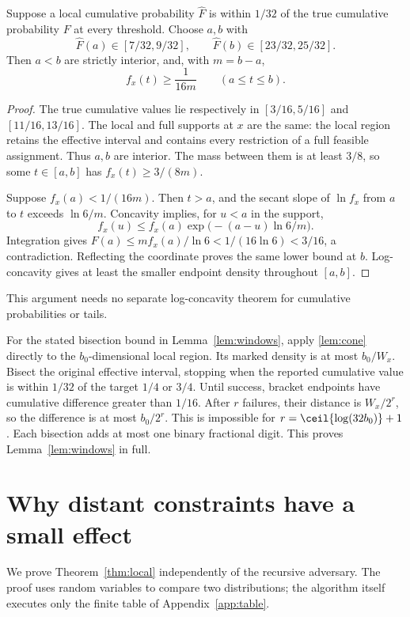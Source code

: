 \begin{lemma}\label{lem:quartile}
Suppose a local cumulative probability $\widehat F$ is within $1/32$ of the true cumulative probability $F$ at every threshold. Choose $a,b$ with
\[
\widehat F(a)\in[7/32,9/32],\qquad
\widehat F(b)\in[23/32,25/32].
\]
Then $a<b$ are strictly interior, and, with $m=b-a$,
\[
f_x(t)\ge\frac1{16m}\qquad(a\le t\le b).
\]
\end{lemma}
\begin{proof}
The true cumulative values lie respectively in $[3/16,5/16]$ and $[11/16,13/16]$. The local and full supports at $x$ are the same: the local region retains the effective interval and contains every restriction of a full feasible assignment. Thus $a,b$ are interior. The mass between them is at least $3/8$, so some $t\in[a,b]$ has $f_x(t)\ge3/(8m)$.

Suppose $f_x(a)<1/(16m)$. Then $t>a$, and the secant slope of $\ln f_x$ from $a$ to $t$ exceeds $\ln6/m$. Concavity implies, for $u<a$ in the support,
\[
f_x(u)\le f_x(a)\exp\bigl(-(a-u)\ln6/m\bigr).
\]
Integration gives $F(a)\le mf_x(a)/\ln6<1/(16\ln6)<3/16$, a contradiction. Reflecting the coordinate proves the same lower bound at $b$. Log-concavity gives at least the smaller endpoint density throughout $[a,b]$.
\end{proof}

This argument needs no separate log-concavity theorem for cumulative probabilities or tails.

For the stated bisection bound in Lemma~\ref{lem:windows}, apply \cref{lem:cone} directly to the $b_0$-dimensional local region. Its marked density is at most $b_0/W_x$. Bisect the original effective interval, stopping when the reported cumulative value is within $1/32$ of the target $1/4$ or $3/4$. Until success, bracket endpoints have cumulative difference greater than $1/16$. After $r$ failures, their distance is $W_x/2^r$, so the difference is at most $b_0/2^r$. This is impossible for $r=\ceil{\log(32b_0)}+1$. Each bisection adds at most one binary fractional digit. This proves Lemma~\ref{lem:windows} in full.


\section{Why distant constraints have a small effect}\label{app:local}

We prove Theorem~\ref{thm:local} independently of the recursive adversary. The proof uses random variables to compare two distributions; the algorithm itself executes only the finite table of Appendix~\ref{app:table}.


